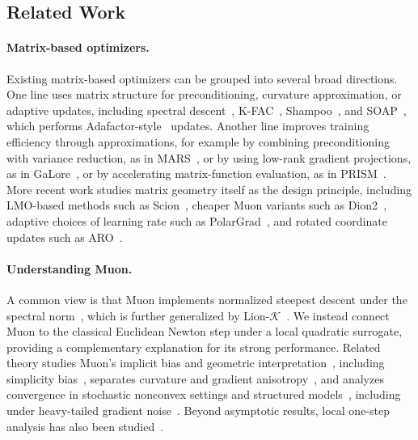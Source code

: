 \documentclass[11pt]{article}
\begin{document}
\subsection{Related Work}
\paragraph{Matrix-based optimizers.}
Existing matrix-based optimizers can be grouped into several broad directions. One line uses matrix structure for preconditioning, curvature approximation, or adaptive updates, including spectral descent~\citep{carlson2015preconditioned}, K-FAC~\citep{martens2015optimizing,george2018fast}, Shampoo~\citep{gupta2018shampoo,morwani2024new}, and SOAP~\citep{vyas2024soap}, which performs Adafactor-style~\citep{shazeer2018adafactor} updates. Another line improves training efficiency through approximations, for example by combining preconditioning with variance reduction, as in MARS~\citep{yuan2024mars}, or by using low-rank gradient projections, as in GaLore~\citep{zhao2024galore,su2025galore}, or by accelerating matrix-function evaluation, as in PRISM~\citep{yang2026prism}. More recent work studies matrix geometry itself as the design principle, including LMO-based methods such as Scion~\citep{pethick2025training}, cheaper Muon variants such as Dion2~\citep{ahn2025dion2}, adaptive choices of learning rate such as PolarGrad~\citep{lau2025polargrad}, and rotated coordinate updates such as ARO~\citep{gong2026aro}.


\paragraph{Understanding Muon.}
A common view is that Muon implements normalized steepest descent under the spectral norm~\citep{bernstein2024old,crawshaw2025exploration,riabinin2025gluon}, which is further generalized by Lion-$\mathcal{K}$~\citep{chen2025muon}. We instead connect Muon to the classical Euclidean Newton step under a local quadratic surrogate, providing a complementary explanation for its strong performance. Related theory studies Muon's implicit bias and geometric interpretation~\citep{fan2025implicit,pethick2025training}, including simplicity bias~\citep{dragutinovic2026use}, separates curvature and gradient anisotropy~\citep{lau2025polargrad}, and analyzes convergence in stochastic nonconvex settings and structured models~\citep{li2025muon,sato2025analysis,ma2026preconditioning}, including under heavy-tailed gradient noise~\citep{yu2026sign}. Beyond asymptotic results, local one-step analysis has also been studied~\citep{su2025isotropic,davis2025spectral,gonon2026insights}.
\end{document}
